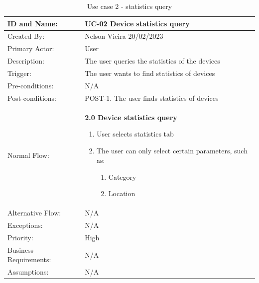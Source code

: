 \documentclass{scrreprt}
\begin{document}
\begin{table}[H]
    \centering
    \begin{adjustbox}{width=1.2\textwidth,center=\textwidth}
        \begin{tabular}{|m{4cm}|m{12cm}|}
            \hline
            ID and Name: & UC-02 Device statistics query \\
            \hline
            Created By: & Nelson Vieira 20/02/2023 \\
            \hline
            Primary Actor: & User \\
            \hline
            Description: & The user queries the statistics of the devices \\
            \hline
            Trigger: & The user wants to find statistics of devices \\
            \hline
            Pre-conditions: & N/A \\
            \hline
            Post-conditions: & POST-1. The user finds statistics of devices \\
            \hline
            Normal Flow: & \textbf{2.0 Device statistics query}
            \begin{enumerate}
                \item User selects statistics tab
                \item The user can only select certain parameters, such as:
                \begin{enumerate}
                    \item Category
                    \item Location
                \end{enumerate}
            \end{enumerate} \\
            \hline
            Alternative Flow: & N/A \\
            \hline
            Exceptions: & N/A \\
            \hline
            Priority: & High \\
            \hline
            Business Requirements: & N/A \\
            \hline
            Assumptions: & N/A \\
            \hline
        \end{tabular}
    \end{adjustbox}
    \caption{Use case 2 - statistics query}
    \label{use case 2}
\end{table}
\end{document}

